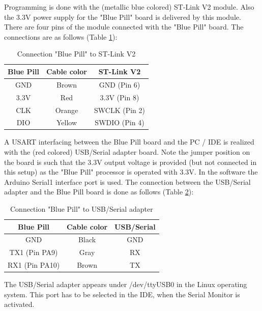 \documentclass[11pt, oneside]{scrartcl}   	%
\begin{document}
Programming is done with the (metallic blue colored) ST-Link V2 module. Also the 3.3V power supply for the "Blue Pill" board is delivered by this module.
There are four pins of the module connected with the "Blue Pill" board.
The connections are as follows (Table \ref{table:ConnectionSTLink1}):
\begin{table}[htbp]
\centering
\begin{tabular}{|c|c|c|}
	\hline
	\textbf{Blue Pill} & \textbf{Cable color} & \textbf{ST-Link V2} \\
	\hline
	GND & Brown & GND (Pin 6) \\
	\hline
	3.3V & Red & 3.3V (Pin 8) \\
	\hline
	CLK & Orange & SWCLK (Pin 2) \\
	\hline
	DIO & Yellow & SWDIO (Pin 4) \\
	\hline
\end{tabular}
\caption{Connection "Blue Pill" to ST-Link V2}
\label{table:ConnectionSTLink1}
\end{table}

A USART interfacing between the Blue Pill board and the PC / IDE is realized with the (red colored) USB/Serial adapter board.
Note the jumper position on the board is such that the 3.3V output voltage is provided (but not connected in this setup) as the "Blue
Pill" processor is operated with 3.3V. In the software the Arduino Serial1 interface port is used.
The connection between the USB/Serial adapter and the Blue Pill board is done as follows (Table \ref{table:ConnectionSerial1}):
\begin{table}[htbp]
\centering
\begin{tabular}{|c|c|c|}
	\hline
	\textbf{Blue Pill} & \textbf{Cable color} & \textbf{USB/Serial} \\
	\hline
	GND & Black & GND \\
	\hline
	TX1 (Pin PA9) & Gray & RX \\
	\hline
	RX1 (Pin PA10) & Brown & TX \\
	\hline
\end{tabular}
\caption{Connection "Blue Pill" to USB/Serial adapter}
\label{table:ConnectionSerial1}
\end{table}

The USB/Serial adapter appears under /dev/ttyUSB0 in the Linux operating system. This port has to be selected in the IDE, when the Serial Monitor is activated.
\end{document}

